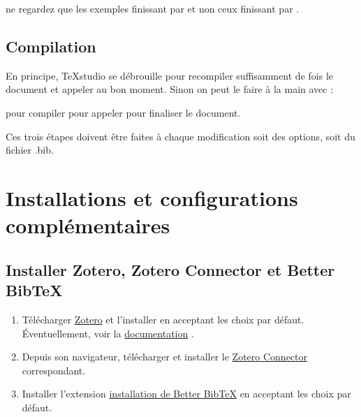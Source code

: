 \attention ne regardez que les exemples finissant par  et non ceux finissant par .




\subsection{Compilation}

En principe, TeXstudio se débrouille pour recompiler suffisamment de fois le document et appeler  au bon moment. Sinon on peut le faire à la main avec :
\begin{center}
	 pour compiler \hspace{.5cm} \textrightarrow \hspace{.5cm}  pour appeler  \hspace{.5cm} \textrightarrow \hspace{.5cm}  pour finaliser le document.
\end{center}

\attention Ces trois étapes doivent être faites à chaque modification soit des options, soit du fichier .bib.





\section{Installations et configurations complémentaires}
\label{sec:installationConfigurationBibliographie}

\subsection{Installer Zotero, Zotero Connector et Better BibTeX}

\begin{enumerate}
		\item Télécharger \href{https://www.zotero.org/download/}{Zotero} \autocite{ZoteroDownloads} et l'installer en acceptant les choix par défaut. \\
			Éventuellement, voir la  \href{https://www.zotero.org/support/fr/start}{documentation} \autocite{FrStartZotero}.
		\item Depuis son navigateur, télécharger et installer le \href{https://www.zotero.org/download/}{Zotero Connector} correspondant.
		\item Installer l'extension \href{https://retorque.re/zotero-better-bibtex/installation/}{installation de Better BibTeX} \autocite{InstallationBetterBibTeX} en acceptant les choix par défaut.
\end{enumerate}



